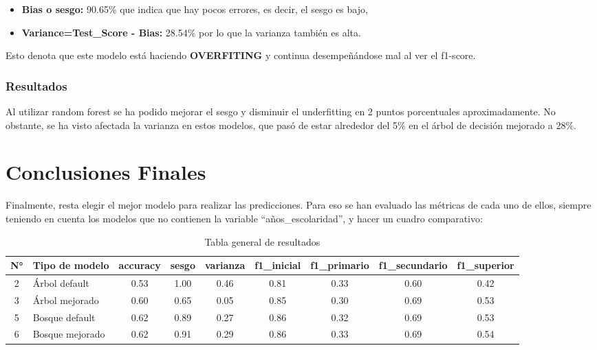 \documentclass[a4paper]{article}
\begin{document}
            \begin{itemize}
                \item \textbf{Bias o sesgo:} 90.65\% que indica que hay pocos errores, es decir, el sesgo es bajo,
                \item \textbf{Variance=Test\_Score - Bias:} 28.54\% por lo que la varianza también es alta. 
            \end{itemize} 

            Esto denota que este modelo está haciendo \textbf{OVERFITING} y continua desempeñándose mal al ver el f1-score.
            
            \subsubsection*{Resultados}
            
             Al utilizar random forest  se ha podido mejorar el sesgo y disminuir el underfitting en 2 puntos porcentuales aproximadamente. No obstante, se ha visto afectada la varianza en estos modelos, que pasó de estar alrededor del 5\% en el árbol de decisión mejorado a 28\%.

\newpage

\section{Conclusiones Finales}

    Finalmente, resta elegir el mejor modelo para realizar las predicciones. Para eso se han evaluado las métricas de cada uno de ellos, siempre teniendo en cuenta los modelos que no contienen la variable ``años\_escolaridad'', y hacer un cuadro comparativo:
    
    \begin{table}[H]
        \centering
        \begin{tabular}{ clccccccc }
            \toprule
           N° & Tipo de modelo & accuracy & sesgo & varianza & f1\_inicial & f1\_primario & f1\_secundario & f1\_superior \\ \midrule
           2  & Árbol default & 0.53 & 1.00 & 0.46 & 0.81 & 0.33 & 0.60 & 0.42 \\ 
           3  &  Árbol mejorado & 0.60 & 0.65 & 0.05 & 0.85 & 0.30 & 0.69 & 0.53 \\
           5  & Bosque default & 0.62 & 0.89 & 0.27 & 0.86 & 0.32 & 0.69 & 0.53 \\ 
           6  & Bosque mejorado & 0.62 & 0.91 & 0.29 & 0.86 & 0.33 & 0.69 & 0.54 \\
           \bottomrule
        \end{tabular}
        \caption{Tabla general de resultados}
        \label{Result table}
    \end{table}
\end{document}
